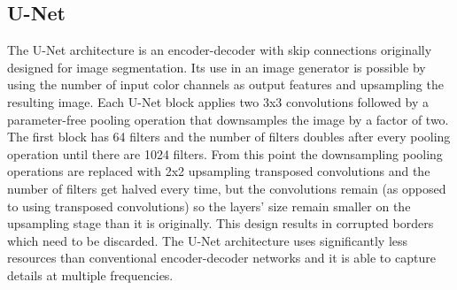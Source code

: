 \subsection{U-Net}
The U-Net architecture is an encoder-decoder with skip connections originally designed for image segmentation. Its use in an image generator is possible by using the number of input color channels as output features and upsampling the resulting image. Each U-Net block applies two 3x3 convolutions followed by a parameter-free pooling operation that downsamples the image by a factor of two. The first block has 64 filters and the number of filters doubles after every pooling operation until there are 1024 filters. From this point the downsampling pooling operations are replaced with 2x2 upsampling transposed convolutions and the number of filters get halved every time, but the convolutions remain (as opposed to using transposed convolutions) so the layers' size remain smaller on the upsampling stage than it is originally. This design results in corrupted borders which need to be discarded. The U-Net architecture uses significantly less resources than conventional encoder-decoder networks and it is able to capture details at multiple frequencies.
